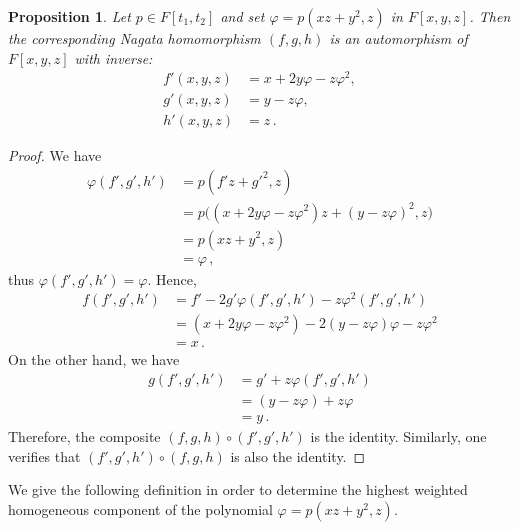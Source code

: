 \documentclass{amsart}
\newtheorem{prop}{Proposition}
\begin{document}
\begin{prop}\label{automp}
	Let  $p\in F[t_1,t_2]$ and set $\varphi=p(xz+y^2,z)$ in $F[x,y,z]$. Then 
	the corresponding Nagata homomorphism $(f,g,h)$ 
	is an automorphism of $F[x,y,z]$ with inverse:
	\begin{equation}\label{pinverse}
		\begin{split}
			f'(x,y,z)&=x+2y \varphi-z\varphi^{2},\\
			g'(x,y,z)&=y-z\varphi,\\
			h'(x,y,z)&=z\,.
		\end{split}
	\end{equation}
\end{prop}
\begin{proof}
	We have
	\begin{align*}
		\varphi(f',g',h')&=p(f'z+g'^2,z)\\
		&=p\Big((x+2y \varphi-z\varphi^{2})z+(y-z\varphi)^2,z\Big)\\
		&=p(xz+y^2,z)\\
		&=\varphi\,,
	\end{align*}
	thus  $ \varphi(f',g',h')=\varphi$. Hence, 
	\begin{align*}
		f(f',g',h')&=f'-2g'\varphi(f',g',h')-z\varphi^{2}(f',g',h')\\
		&=(x+2y \varphi-z\varphi^{2})-2(y-z\varphi)\varphi-z\varphi^{2}\\
		&=x\,.
	\end{align*}
	On the other hand, we have
	\begin{align*}
		g(f',g',h')&=g'+z\varphi(f',g',h')\\
		&=(y-z\varphi)+z\varphi\\
		&=y\,.
	\end{align*}
	Therefore, the composite $(f,g,h)\circ(f',g',h')$ is the identity. Similarly, one verifies that  $(f',g',h')\circ(f,g,h)$ is also the identity.   
\end{proof}



We give the following definition in order to determine the highest weighted homogeneous component of the polynomial $\varphi=p(xz+y^2,z)$.
\end{document}
